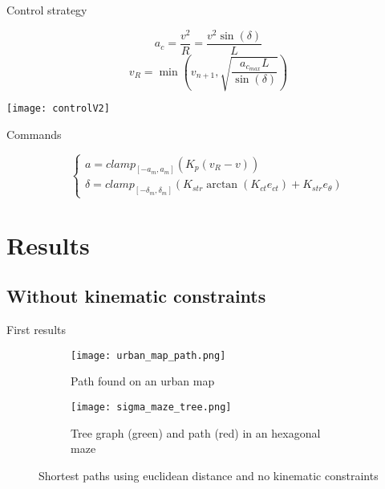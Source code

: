 \documentclass[pdftex,beamer]{beamer}
\theoremstyle{definition}
\theoremstyle{example}
\theoremstyle{plain}
\begin{document}
\begin{frame}{Control strategy}
  \begin{minipage}{0.5\textwidth}
    \begin{figure}[H]
      \begin{equation*}
        a_c = \frac{v^2}{R} = \frac{v^2\sin(\delta)}{L}
      \end{equation*}
      \begin{equation*}
        v_R = \min(v_{n+1}, \sqrt{\frac{a_{c_{max}} L}{\sin(\delta)}})
      \end{equation*}
    \end{figure}
    \end{minipage}%
    \begin{minipage}{0.5\textwidth}
    \centering
    \texttt{[image: controlV2]} %
    \end{minipage}
 

  \begin{block}{Commands}
    
    \begin{equation}
      \begin{cases}
        a = {clamp}_{[-a_{m},a_{m}]}(K_p(v_R-v)) \\
        \delta = {clamp}_{[-\delta_{m},\delta_{m}]}(K_{str} \arctan(K_{ct} e_{ct}) + K_{str} e_{\theta}) 
      \end{cases}
    \end{equation}
    
  \end{block}
\end{frame}

\section{Results}
\subsection{Without kinematic constraints}

\begin{frame}
\end{frame}


\begin{frame}{First results}
  \begin{figure}[H]
    \begin{subfigure}{0.49\textwidth}
      \centering
      \texttt{[image: urban\_map\_path.png]}
      \caption{Path found on an urban map}
    \end{subfigure}
    \begin{subfigure}{0.49\textwidth}
      \centering
      \texttt{[image: sigma\_maze\_tree.png]}
      \caption{Tree graph (green) and path (red) in an hexagonal maze}
    \end{subfigure}
    \caption{Shortest paths using euclidean distance and no kinematic constraints}
  \end{figure}
\end{frame}
\end{document}
